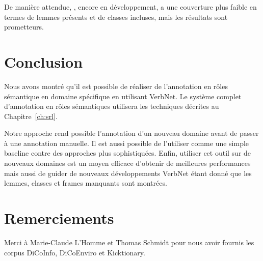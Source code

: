 De manière attendue, \verbenet{}, encore en développement, a une couverture
plus faible en termes de lemmes présents et de classes incluses, mais les
résultats sont prometteurs.

\section*{Conclusion}

Nous avons montré qu'il est possible de réaliser de l'annotation en rôles
sémantique en domaine spécifique en utilisant VerbNet. Le système complet
d'annotation en rôles sémantiques utilisera les techniques décrites au
Chapitre~\ref{ch:srl}.

Notre approche rend possible l'annotation d'un nouveau domaine avant de passer
à une annotation manuelle. Il est aussi possible de l'utiliser comme une simple
baseline contre des approches plus sophistiquées. Enfin, utiliser cet outil sur
de nouveaux domaines est un moyen efficace d'obtenir de meilleures performances
mais aussi de guider de nouveaux développements VerbNet étant donné que les
lemmes, classes et frames manquants sont montrées.

\section*{Remerciements}

Merci à Marie-Claude L'Homme et Thomas Schmidt pour nous avoir fournis les
corpus DiCoInfo, DiCoEnviro et Kicktionary.
